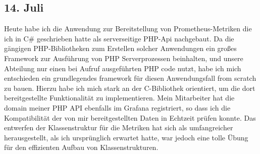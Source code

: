 \subsection{14. Juli}
Heute habe ich die Anwendung zur Bereitstellung von Prometheus-Metriken die ich in C\# geschrieben hatte als serverseitige PHP-Api nachgebaut. Da die gängigen PHP-Bibliotheken zum Erstellen solcher Anwendungen ein großes Framework zur Ausführung von PHP Serverprozessen beinhalten, und unsere Abteilung nur einen bei Aufruf ausgeführten PHP code nutzt, habe ich mich entschieden ein grundlegendes framework für diesen Anwendungsfall from scratch zu bauen. Hierzu habe ich mich stark an der C-Bibliothek orientiert, um die dort bereitgestellte Funktionalität zu implementieren. Mein Mitarbeiter hat die domain meiner PHP API ebenfalls im Grafana registriert, so dass ich die Kompatibilität der von mir bereitgestellten Daten in Echtzeit prüfen konnte. Das entwerfen der Klassenstruktur für die Metriken hat sich als umfangreicher herausgestellt, als ich ursprünglich erwartet hatte, war jedoch eine tolle Übung für den effizienten Aufbau von Klassenstrukturen.
